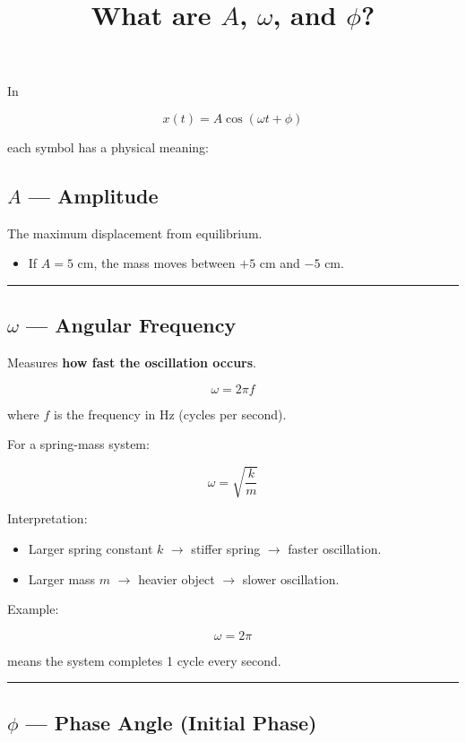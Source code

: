 \documentclass[UTF8,a4paper,11pt]{ctexart}
\title{What are $A$, $\omega$, and $\phi$?}
\author{}
\date{}
\begin{document}
\maketitle

In

\[
x(t)=A\cos(\omega t+\phi)
\]

each symbol has a physical meaning:

\subsection{$A$ — Amplitude}

The maximum displacement from equilibrium.

\begin{itemize}
  \item If $A=5$ cm, the mass moves between $+5$ cm and $-5$ cm.
\end{itemize}

\bigskip\noindent\rule{\linewidth}{0.4pt}\bigskip

\subsection{$\omega$ — Angular Frequency}

Measures \textbf{how fast the oscillation occurs}.

\[
\omega = 2\pi f
\]

where $f$ is the frequency in Hz (cycles per second).

For a spring-mass system:

\[
\omega=\sqrt{\frac{k}{m}}
\]

Interpretation:

\begin{itemize}
  \item Larger spring constant $k$ $\rightarrow$ stiffer spring $\rightarrow$ faster oscillation.
  \item Larger mass $m$ $\rightarrow$ heavier object $\rightarrow$ slower oscillation.
\end{itemize}

Example:

\[
\omega=2\pi
\]

means the system completes 1 cycle every second.

\bigskip\noindent\rule{\linewidth}{0.4pt}\bigskip

\subsection{$\phi$ — Phase Angle (Initial Phase)}
\end{document}

